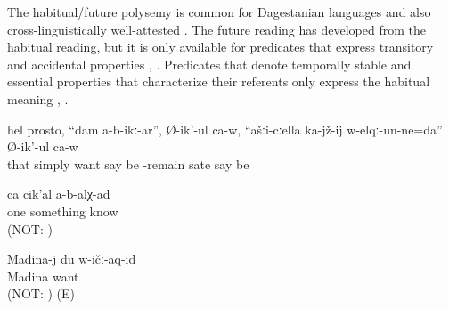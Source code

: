 The habitual/future polysemy is common for Dagestanian languages \citep{Tatevosov2005} and also cross-linguistically well-attested \citep{Haspelmath1998}. The future reading has developed from the habitual reading, but it is only available for predicates that express transitory and accidental properties , . Predicates that denote temporally stable and essential properties that characterize their referents only express the habitual meaning , .
%
\begin{exe}
	\ex	\label{ex:I do not want to sit with you}
	\gll	hel	prosto,	``dam	a-b-ikː-ar'', Ø-ik'-ul ca-w,	``ašːi-cːella ka-jž-ij w-elqː-un-ne=da''	Ø-ik'-ul	ca-w\\
		that	simply		want	say	be		-remain sate say	be\\
	\glt	{}

	\ex	\label{ex:I don't know anything}
	\gll	ca	cik'al	a-b-alχ-ad\\
		one	something	know\\
	\glt	{} (NOT: )

	\ex	\label{ex:Madina loves me}
	\gll	Madina-j	du	w-ičː-aq-id\\
		Madina		want\\
	\glt	{} (NOT: ) (E)
\end{exe}

